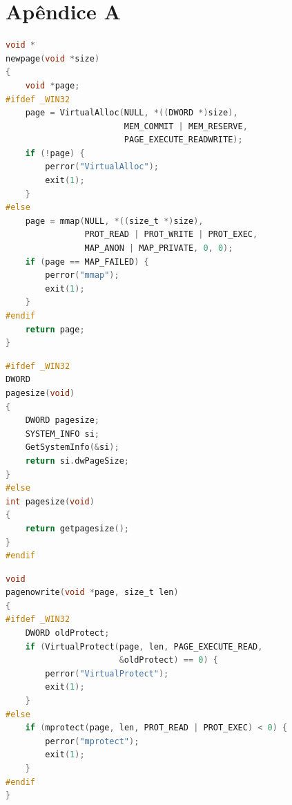 





\section*{Apêndice A}

\renewcommand\lstlistingname{Código}

\begin{lstlisting}[language=C, caption={Alocação de página(s) para o
    compilador JIT}, frame=tb]
void *
newpage(void *size)
{
    void *page;
#ifdef _WIN32
    page = VirtualAlloc(NULL, *((DWORD *)size),
                        MEM_COMMIT | MEM_RESERVE,
                        PAGE_EXECUTE_READWRITE);
    if (!page) {
        perror("VirtualAlloc");
        exit(1);
    }
#else
    page = mmap(NULL, *((size_t *)size),
                PROT_READ | PROT_WRITE | PROT_EXEC,
                MAP_ANON | MAP_PRIVATE, 0, 0);
    if (page == MAP_FAILED) {
        perror("mmap");
        exit(1);
    }
#endif
    return page;
}
\end{lstlisting}


\begin{lstlisting}[language=C, caption={Tamanho, em bytes, de uma
    página}, frame=tb]
#ifdef _WIN32
DWORD
pagesize(void)
{
    DWORD pagesize;
    SYSTEM_INFO si;
    GetSystemInfo(&si);
    return si.dwPageSize;
}
#else
int pagesize(void)
{
    return getpagesize();
}
#endif
\end{lstlisting}


\begin{lstlisting}[language=C, caption={Remoção da permissão de
    escrita de uma ou mais páginas}, frame=tb]
void
pagenowrite(void *page, size_t len)
{
#ifdef _WIN32
    DWORD oldProtect;
    if (VirtualProtect(page, len, PAGE_EXECUTE_READ,
                       &oldProtect) == 0) {
        perror("VirtualProtect");
        exit(1);
    }
#else
    if (mprotect(page, len, PROT_READ | PROT_EXEC) < 0) {
        perror("mprotect");
        exit(1);
    }
#endif
}
\end{lstlisting}

\newpage

\renewcommand{\arraystretch}{1.2}

